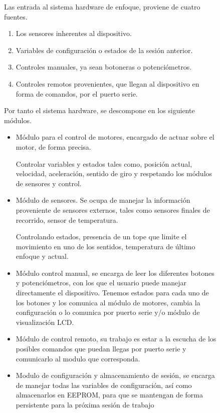\begin{figure}[h]
Las entrada al sistema hardware de enfoque, proviene de cuatro fuentes.

\begin{enumerate}
\item Los sensores inherentes al dispositivo.
\item Variables de configuración o estados de la sesión anterior. 
\item Controles manuales, ya sean botoneras o potenciómetros.
\item Controles remotos provenientes, que llegan al dispositivo en forma de comandos, por el puerto serie.
\end{enumerate}

Por tanto el sistema hardware, se descompone en los siguiente módulos.

\begin{itemize}

\item Módulo para el control de motores, encargado de actuar sobre el motor, de forma precisa.

Controlar variables y estados tales como, posición actual, velocidad, aceleración, sentido de giro y respetando los módulos de sensores y control. 

\item Módulo de sensores. Se ocupa de manejar la información proveniente de sensores externos, tales como sensores finales de recorrido, sensor de temperatura.

Controlando estados, presencia de un tope que limite el movimiento en uno de los sentidos, temperatura de último enfoque y actual.

\item Módulo control manual, se encarga de leer los diferentes botones y potenciómetros, con los que el usuario puede manejar directamente el dispositivo.
Tenemos estados para cada uno de los botones y los comunica al módulo de motores, cambia la configuración o lo comunica por puerto serie y/o módulo de visualización LCD.

\item Módulo de control remoto, su trabajo es estar a la escucha de los posibles comandos que puedan llegas por puerto serie y comunicarlo al modulo que corresponda. 

\item Modulo de configuración y almacenamiento de sesión, se encarga de manejar todas las variables de configuración, así como almacenarlos en EEPROM, para que se mantengan de forma persistente para la próxima sesión de trabajo


\end{itemize}
\end{figure}
